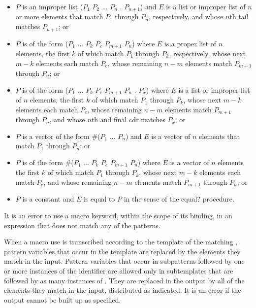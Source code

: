 \begin{entry}
\begin{itemize}
\item $P$ is an improper list
      {\cf ($P_1$ $P_2$ $\dots$ $P_n$ . $P_{n+1}$)}
      and $E$ is a list or
      improper list of $n$ or more elements that match $P_1$ through $P_n$,
      respectively, and whose $n$th tail matches $P_{n+1}$; or

\item $P$ is of the form
      {\cf ($P_1$ $\dots$ $P_k$ $P_e$  $P_{m+1}$ \dotsfoo{} $P_n$)}
      where $E$ is
      a proper list of $n$ elements, the first $k$ of which match
      $P_1$ through $P_k$, respectively,
      whose next $m-k$ elements each match $P_e$,
      whose remaining $n-m$ elements match $P_{m+1}$ through $P_n$; or

\item $P$ is of the form
      {\cf ($P_1$ $\dots$ $P_k$ $P_{e}$  $P_{m+1}$ \dotsfoo{} $P_n$ . $P_x$)}
      where $E$ is
      a list or improper list of $n$ elements, the first $k$ of which match
      $P_1$ through $P_k$,
      whose next $m-k$ elements each match $P_e$,
      whose remaining $n-m$ elements match $P_{m+1}$ through $P_n$,
      and whose $n$th and final cdr matches $P_x$; or

\item $P$ is a vector of the form {\cf \#($P_1$ $\dots$ $P_n$)}
      and $E$ is a vector
      of $n$ elements that match $P_1$ through $P_n$; or

\item $P$ is of the form
      {\cf \#($P_1$ $\dots$ $P_k$ $P_{e}$  $P_{m+1}$ \dotsfoo $P_n$)}
      where $E$ is a vector of $n$
      elements the first $k$ of which match $P_1$ through $P_k$,
      whose next $m-k$ elements each match $P_e$,
      and whose remaining $n-m$ elements match $P_{m+1}$ through $P_n$; or

\item $P$ is a constant and $E$ is equal to $P$ in the sense of
      the {\cf equal?} procedure.
\end{itemize}

It is an error to use a macro keyword, within the scope of its
binding, in an expression that does not match any of the patterns.

When a macro use is transcribed according to the template of the
matching , pattern variables that occur in the
template are replaced by the elements they match in the input.
Pattern variables that occur in subpatterns followed by one or more
instances of the identifier
 are allowed only in subtemplates that are
followed by as many instances of .
They are replaced in the
output by all of the elements they match in the input, distributed as
indicated.  It is an error if the output cannot be built up as
specified.


\end{entry}
